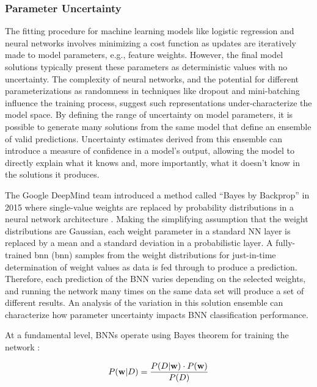 \subsubsection{Parameter Uncertainty}
\label{ch5:param_uncertainty}

The fitting procedure for machine learning models like logistic regression and neural networks involves minimizing a cost function as updates are iteratively made to model parameters, e.g., feature weights. However, the final model solutions typically present these parameters as deterministic values with no uncertainty. The complexity of neural networks, and the potential for different parameterizations as randomness in techniques like dropout and mini-batching influence the training process, suggest such representations under-characterize the model space. By defining the range of uncertainty on model parameters, it is possible to generate many solutions from the same model that define an ensemble of valid predictions. Uncertainty estimates derived from this ensemble can introduce a measure of confidence in a model’s output, allowing the model to directly explain what it knows and, more importantly, what it doesn’t know in the solutions it produces.

The Google DeepMind team introduced a method called “Bayes by Backprop” in 2015 where single-value weights are replaced by probability distributions in a neural network architecture \citep{blundell_weight_2015}. Making the simplifying assumption that the weight distributions are Gaussian, each weight parameter in a standard NN layer is replaced by a mean and a standard deviation in a probabilistic layer. A fully-trained \acrlong{bnn} (\acrshort{bnn}) samples from the weight distributions for just-in-time determination of weight values as data is fed through to produce a prediction. Therefore, each prediction of the BNN varies depending on the selected weights, and running the network many times on the same data set will produce a set of different results. An analysis of the variation in this solution ensemble can characterize how parameter uncertainty impacts BNN classification performance.

At a fundamental level, BNNs operate using Bayes theorem for training the network \citep{webster_probabilistic_2021}:

\begin{equation}
    \label{eq:bayesrule}
    P({\bf w} \vert D) = \frac{P(D \vert {\bf w}) \cdot P({\bf w})}{P(D)}
\end{equation}

